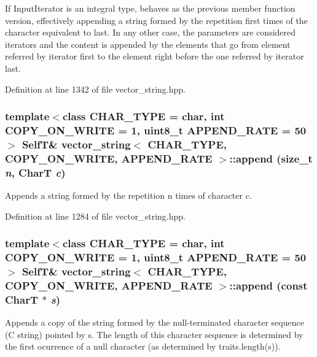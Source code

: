 If InputIterator is an integral type, behaves as the previous member function version, effectively appending a string formed by the repetition first times of the character equivalent to last. In any other case, the parameters are considered iterators and the content is appended by the elements that go from element referred by iterator first to the element right before the one referred by iterator last. 

Definition at line 1342 of file vector\_\-string.hpp.\hypertarget{classvector__string_5ba69172d97507ef4ad47a175cfe2d57}{
\subsubsection[{append}]{\setlength{\rightskip}{0pt plus 5cm}template$<$class CHAR\_\-TYPE  = char, int COPY\_\-ON\_\-WRITE = 1, uint8\_\-t APPEND\_\-RATE = 50$>$ {\bf SelfT}\& {\bf vector\_\-string}$<$ CHAR\_\-TYPE, COPY\_\-ON\_\-WRITE, APPEND\_\-RATE $>$::append (size\_\-t {\em n}, \/  CharT {\em c})}}
\label{classvector__string_5ba69172d97507ef4ad47a175cfe2d57}


Appends a string formed by the repetition n times of character c. 

Definition at line 1284 of file vector\_\-string.hpp.\hypertarget{classvector__string_151eff60f6b36bfe2d0c964017ef64b9}{
\subsubsection[{append}]{\setlength{\rightskip}{0pt plus 5cm}template$<$class CHAR\_\-TYPE  = char, int COPY\_\-ON\_\-WRITE = 1, uint8\_\-t APPEND\_\-RATE = 50$>$ {\bf SelfT}\& {\bf vector\_\-string}$<$ CHAR\_\-TYPE, COPY\_\-ON\_\-WRITE, APPEND\_\-RATE $>$::append (const CharT $\ast$ {\em s})}}
\label{classvector__string_151eff60f6b36bfe2d0c964017ef64b9}


Appends a copy of the string formed by the null-terminated character sequence (C string) pointed by s. The length of this character sequence is determined by the first ocurrence of a null character (as determined by traits.length(s)). 

